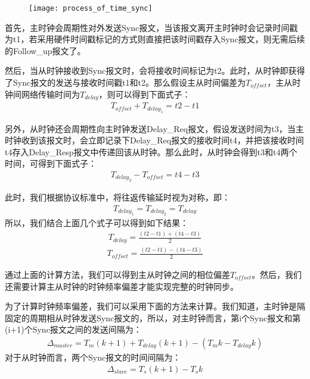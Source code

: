 \begin{figure}[!hbp]
  \centering
  \begin{minipage}[b]{0.6\textwidth}
    \captionstyle{\centering}
    \centering
    \texttt{[image: process\_of\_time\_sync]}
  \end{minipage}     
\end{figure}

首先，主时钟会周期性对外发送Sync报文，当该报文离开主时钟时会记录时间戳为t1，若采用硬件时间戳标记的方式则直接把该时间戳存入Sync报文，则无需后续的Follow\_up报文了。

然后，当从时钟接收到Sync报文时，会将接收时间标记为t2。此时，从时钟即获得了Sync报文的发送与接收时间戳t1和t2。那么假设主从时间偏差为$T_{offset}$，主从时钟间网络传输时间为$T_{delay}$，则可以得到下面式子：
\begin{align}
	T_{offset} + T_{delay_1} = t2 - t1
\end{align}

另外，从时钟还会周期性向主时钟发送Delay\_Req报文，假设发送时间为t3，当主时钟收到该报文时，会立即记录下Delay\_Req报文的接收时间t4，并把该接收时间t4存入Delay\_Resp报文中传递回该从时钟。那么此时，从时钟会得到t3和t4两个时间，可得到下面式子：
\begin{align}
	T_{delay_2} - T_{offset} = t4 - t3
\end{align}

此时，我们根据协议标准中，将往返传输延时视为对称，即：
\begin{align}
	T_{delay_1} = T_{delay_2} = T_{delay}
\end{align}
所以，我们结合上面几个式子可以得到如下结果：
\begin{align}
	T_{delay} = \frac{(t2 - t1) + (t4 - t3)}{2}
\end{align}
\begin{align}
	T_{offset} = \frac{(t2 - t1) - (t4 - t3)}{2}
\end{align}

通过上面的计算方法，我们可以得到主从时钟之间的相位偏差$T_{offset}$。然后，我们还需要计算主从时钟的时钟频率偏差才能实现完整的时钟同步。

为了计算时钟频率偏差，我们可以采用下面的方法来计算。我们知道，主时钟是隔固定的周期相从时钟发送Sync报文的，所以，对主时钟而言，第i个Sync报文和第(i+1)个Sync报文之间的发送间隔为：
\begin{align}
	\Delta _{master} = T_{m}(k + 1) + T_{delay}(k + 1) - (T_{m}k - T_{delay}k)
\end{align}
对于从时钟而言，两个Sync报文的时间间隔为：
\begin{align}
	\Delta _{slave} = T_{s}(k + 1) - T_{s}k
\end{align}

